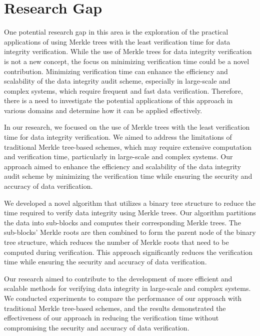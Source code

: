 \section{Research Gap}
\large
One potential research gap in this area is the exploration of the practical applications of using Merkle trees with the least verification time for data integrity verification. While the use of Merkle trees for data integrity verification is not a new concept, the focus on minimizing verification time could be a novel contribution. Minimizing verification time can enhance the efficiency and scalability of the data integrity audit scheme, especially in large-scale and complex systems, which require frequent and fast data verification. Therefore, there is a need to investigate the potential applications of this approach in various domains and determine how it can be applied effectively.

In our research, we focused on the use of Merkle trees with the least verification time for data integrity verification. We aimed to address the limitations of traditional Merkle tree-based schemes, which may require extensive computation and verification time, particularly in large-scale and complex systems. Our approach aimed to enhance the efficiency and scalability of the data integrity audit scheme by minimizing the verification time while ensuring the security and accuracy of data verification.

We developed a novel algorithm that utilizes a binary tree structure to reduce the time required to verify data integrity using Merkle trees. Our algorithm partitions the data into sub-blocks and computes their corresponding Merkle trees. The sub-blocks' Merkle roots are then combined to form the parent node of the binary tree structure, which reduces the number of Merkle roots that need to be computed during verification. This approach significantly reduces the verification time while ensuring the security and accuracy of data verification.

Our research aimed to contribute to the development of more efficient and scalable methods for verifying data integrity in large-scale and complex systems. We conducted experiments to compare the performance of our approach with traditional Merkle tree-based schemes, and the results demonstrated the effectiveness of our approach in reducing the verification time without compromising the security and accuracy of data verification.